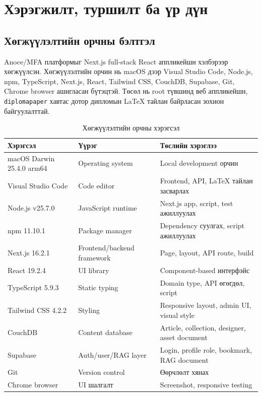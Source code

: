 
\chapter{Хэрэгжилт, туршилт ба үр дүн}
\label{Chapter4}

\section{Хөгжүүлэлтийн орчны бэлтгэл}
Anoce/MFA платформыг Next.js full-stack React аппликейшн хэлбэрээр хөгжүүлсэн. Хөгжүүлэлтийн орчин нь macOS дээр Visual Studio Code, Node.js, npm, TypeScript, Next.js, React, Tailwind CSS, CouchDB, Supabase, Git, Chrome browser ашигласан бүтэцтэй. Төсөл нь root түвшинд веб аппликейшн, \texttt{diplomapaper} хавтас дотор дипломын LaTeX тайлан байрласан зохион байгуулалттай.

\begin{table}[htbp]
  \centering
  \small
  \begin{tabular}{|L{0.24\textwidth}|L{0.28\textwidth}|L{0.34\textwidth}|}
    \hline
    \textbf{Хэрэгсэл} & \textbf{Үүрэг} & \textbf{Төслийн хэрэглээ} \\ \hline
    macOS Darwin 25.4.0 arm64 & Operating system & Local development орчин \\ \hline
    Visual Studio Code & Code editor & Frontend, API, LaTeX тайлан засварлах \\ \hline
    Node.js v25.7.0 & JavaScript runtime & Next.js app, script, test ажиллуулах \\ \hline
    npm 11.10.1 & Package manager & Dependency суулгах, script ажиллуулах \\ \hline
    Next.js 16.2.1 & Frontend/backend framework & Page, layout, API route, build \\ \hline
    React 19.2.4 & UI library & Component-based интерфэйс \\ \hline
    TypeScript 5.9.3 & Static typing & Domain type, API өгөгдөл, script \\ \hline
    Tailwind CSS 4.2.2 & Styling & Responsive layout, admin UI, visual style \\ \hline
    CouchDB & Content database & Article, collection, designer, asset document \\ \hline
    Supabase & Auth/user/RAG layer & Login, profile role, bookmark, RAG document \\ \hline
    Git & Version control & Өөрчлөлт хянах \\ \hline
    Chrome browser & UI шалгалт & Screenshot, responsive testing \\ \hline
  \end{tabular}
  \vspace{0.4em}
  \caption{Хөгжүүлэлтийн орчны хэрэгсэл}
  \label{tab:ch4-development-tools}
\end{table}

